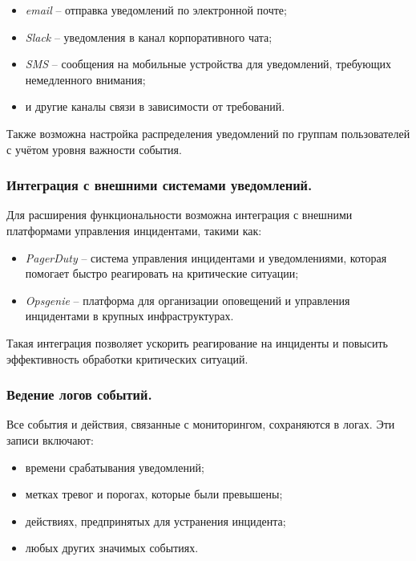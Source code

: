 \begin{itemize}
    \item \textit{email} -- отправка уведомлений по электронной почте;
    \item \textit{Slack} -- уведомления в канал корпоративного чата;
    \item \textit{SMS} -- сообщения на мобильные устройства для уведомлений, требующих немедленного внимания;
    \item и другие каналы связи в зависимости от требований.
\end{itemize}

Также возможна настройка распределения уведомлений по группам пользователей с учётом уровня важности события.

\subsubsection{Интеграция с внешними системами уведомлений.}  
Для расширения функциональности возможна интеграция с внешними платформами управления инцидентами, такими как:

\begin{itemize}
    \item \textit{PagerDuty} -- система управления инцидентами и уведомлениями, которая помогает быстро реагировать на критические ситуации;
    \item \textit{Opsgenie} -- платформа для организации оповещений и управления инцидентами в крупных инфраструктурах.
\end{itemize}

Такая интеграция позволяет ускорить реагирование на инциденты и повысить эффективность обработки критических ситуаций.

\subsubsection{Ведение логов событий.}  
Все события и действия, связанные с мониторингом, сохраняются в логах. Эти записи включают:

\begin{itemize}
    \item времени срабатывания уведомлений;
    \item метках тревог и порогах, которые были превышены;
    \item действиях, предпринятых для устранения инцидента;
    \item любых других значимых событиях.
\end{itemize}

